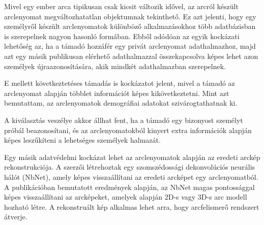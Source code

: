 Mivel egy ember arca tipikusan csak kicsit változik idővel, az arcról készült arclenyomat megváltozhatatlan objektumnak tekinthető. Ez azt jelenti, hogy egy személyről készült arclenyomatok különböző alkalmazásokhoz több adatbázisban is szerepelnek nagyon hasonló formában. Ebből adódóan az egyik kockázati lehetőség az, ha a támadó hozzáfér egy privát arclenyomat adathalmazhoz, majd azt egy másik publikusan elérhető adathalmazzal összekapcsolva képes lehet azon személyek újraazonosítására, akik mindkét adathalmazban szerepelnek.

E mellett következtetéses támadás is kockázatot jelent, mivel a támadó az arclenyomat alapján többlet információt képes kikövetkeztetni. Mint azt bemutattam, az arclenyomatok demográfiai adatokat szivárogtathatnak ki. 

A kiválasztás veszélye akkor állhat fent, ha a támadó egy bizonyost személyt próbál beazonosítani, és az arclenyomatokból kinyert extra információk alapján képes leszűkíteni a lehetséges személyek halmazát.

Egy másik adatvédelmi kockázat lehet az arclenyomatok alapján az eredeti arckép rekonstrukciója. A \cite{mai2018reconstruction} szerzői létrehoztak egy szomszédossági dekonvolúciós neurális hálót (NbNet), amely képes visszaállítani az eredeti arcképet egy arclenyomatból. A publikációban bemutatott eredmények alapján, az NbNet magas pontossággal képes visszaállítani az arcképeket, amelyek alapján 2D-s vagy 3D-s arc modell hozható létre. A rekonstruált kép alkalmas lehet arra, hogy arcfelismerő rendszert átverje.




